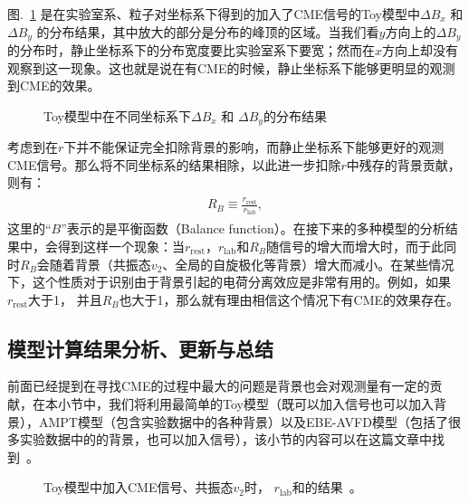  图.~\ref{fig:BFHisto_rest_lab_example} 是在实验室系、粒子对坐标系下得到的加入了CME信号的Toy模型中$\Delta B_x$ 和 $\Delta B_y$ 的分布结果，其中放大的部分是分布的峰顶的区域。当我们看$y$方向上的$\Delta B_y$的分布时，静止坐标系下的分布宽度要比实验室系下要宽；然而在$x$方向上却没有观察到这一现象。这也就是说在有CME的时候，静止坐标系下能够更明显的观测到CME的效果。
\begin{figure}[htbp]
\centering
{}
\caption{Toy模型中在不同坐标系下$\Delta B_x$ 和 $\Delta B_y$的分布结果~\cite{Tang2019}}
\label{fig:BFHisto_rest_lab_example}
\end{figure}


考虑到在$r$下并不能保证完全扣除背景的影响，而静止坐标系下能够更好的观测CME信号。那么将不同坐标系的结果相除，以此进一步扣除$r$中残存的背景贡献，则有：
\begin{eqnarray}
\begin{aligned}
R_{B} \equiv  \frac{r_{\mathrm{rest}}}{r_{\mathrm{lab}}},
\end{aligned}
\label{eq:R_B}
\end{eqnarray}
这里的“$B$”表示的是平衡函数（Balance function）。在接下来的多种模型的分析结果中，会得到这样一个现象：当$r_{\mathrm{rest}}$，$r_{\mathrm{lab}}$和$R_{B}$随信号的增大而增大时，而于此同时$R_{B}$会随着背景（共振态$v_2$、全局的自旋极化等背景）增大而减小。在某些情况下，这个性质对于识别由于背景引起的电荷分离效应是非常有用的。例如，如果$r_{\mathrm{rest}} $大于1， 并且$R_{B}$也大于1，那么就有理由相信这个情况下有CME的效果存在。


\subsection{模型计算结果分析、更新与总结}

前面已经提到在寻找CME的过程中最大的问题是背景也会对观测量有一定的贡献，在本小节中，我们将利用最简单的Toy模型（既可以加入信号也可以加入背景），AMPT模型（包含实验数据中的各种背景）以及EBE-AVFD模型（包括了很多实验数据中的的背景，也可以加入信号），该小节的内容可以在这篇文章中找到~\cite{Lin2021}。
\begin{figure}[htbp]
\centering
{}
\caption{Toy模型中加入CME信号、共振态$v_2$时\rrest， $r_{\mathrm{lab}}$和\rb 的结果~\cite{Lin2021}。}
\label{fig:resonancev2}
\end{figure} 

